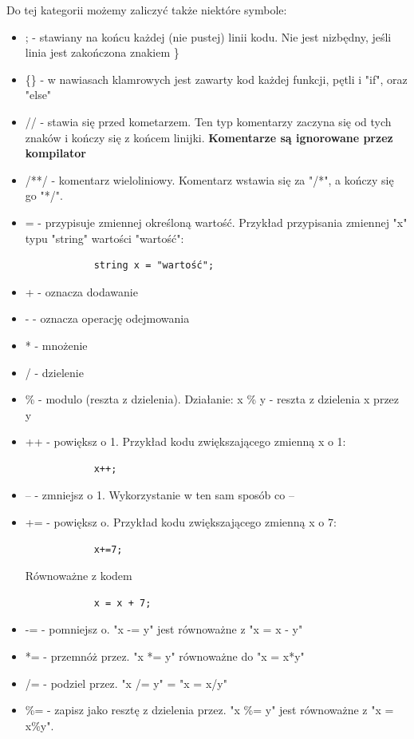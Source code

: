 	Do tej kategorii możemy zaliczyć także niektóre symbole:
	\begin{itemize}
		\item ; - stawiany na końcu każdej (nie pustej) linii kodu. Nie jest nizbędny, jeśli linia jest zakończona znakiem \}
		\item \{\} - w nawiasach klamrowych jest zawarty kod każdej funkcji, pętli i "if", oraz "else"
		\item // - stawia się przed kometarzem. Ten typ komentarzy zaczyna się od tych znaków i kończy się z końcem linijki. \textbf{Komentarze są ignorowane przez kompilator} 
		\item /**/ - komentarz wieloliniowy. Komentarz wstawia się za "/*", a kończy się go "*/".
		\item = - przypisuje zmiennej określoną wartość. Przykład przypisania zmiennej "x" typu "string" wartości "wartość":
			\begin{verbatim}
			string x = "wartość";
			\end{verbatim}
		\item + - oznacza dodawanie
		\item - - oznacza operację odejmowania
		\item * - mnożenie
		\item / - dzielenie
		\item \% - modulo (reszta z dzielenia). Działanie: x \% y - reszta z dzielenia x przez y
		\item ++ - powiększ o 1. Przykład kodu zwiększającego zmienną x o 1:
			\begin{verbatim}
			x++;
			\end{verbatim}
		\item -- - zmniejsz o 1. Wykorzystanie w ten sam sposób co --
		\item += - powiększ o. Przykład kodu zwiększającego zmienną x o 7:
			\begin{verbatim}
			x+=7;
			\end{verbatim}
			Równoważne z kodem
			\begin{verbatim}
			x = x + 7;
			\end{verbatim}
		\item -= - pomniejsz o. "x -= y" jest równoważne z "x = x - y"
		\item *= - przemnóż przez. "x *= y" równoważne do "x = x*y"
		\item /= - podziel przez. "x /= y" = "x = x/y"
		\item \%= - zapisz jako resztę z dzielenia przez. "x \%= y" jest równoważne z "x = x\%y".
	\end{itemize}
